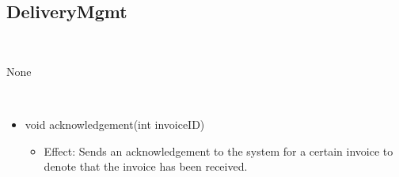   \subsection{DeliveryMgmt}\label{int:OnlineServiceOnlineServiceInvoiceManagerDeliveryMgmt}
    \begin{description}
      \item[Provided by:] \iconcomponent{}~
      \item[Required by:] None
      \item[Operations:] ~
    \begin{itemize}[noitemsep,nolistsep,leftmargin=-.25cm]
      \item \textsf{void acknowledgement(int invoiceID)}
        \begin{itemize}[noitemsep,nolistsep]
           \item Effect: Sends an acknowledgement to the system for a certain invoice to denote that the invoice has been received.
        \end{itemize}
    \end{itemize}
    \end{description}

